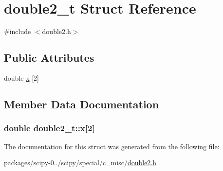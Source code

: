 \hypertarget{structdouble2__t}{}\section{double2\+\_\+t Struct Reference}
\label{structdouble2__t}


{\ttfamily \#include $<$double2.\+h$>$}

\subsection*{Public Attributes}
\begin{DoxyCompactItemize}
\item 
double \hyperlink{structdouble2__t_a04fb0333c672efa1289e4be52aaf54e1}{x} \mbox{[}2\mbox{]}
\end{DoxyCompactItemize}


\subsection{Member Data Documentation}
\hypertarget{structdouble2__t_a04fb0333c672efa1289e4be52aaf54e1}{}
\subsubsection[{x}]{\setlength{\rightskip}{0pt plus 5cm}double double2\+\_\+t\+::x\mbox{[}2\mbox{]}}\label{structdouble2__t_a04fb0333c672efa1289e4be52aaf54e1}


The documentation for this struct was generated from the following file\+:\begin{DoxyCompactItemize}
\item 
packages/scipy-\/0../scipy/special/c\+\_\+misc/\hyperlink{double2_8h}{double2.\+h}\end{DoxyCompactItemize}
